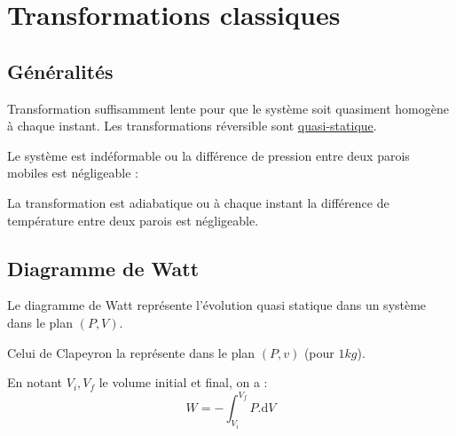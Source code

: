 \documentclass[11pt]{article}
\theoremstyle{cstyle}{\newtheorem{definition}{Définition}[section]}
\theoremstyle{cstyle}{\newtheorem{proposition}[definition]{Propriété}}
\theoremstyle{cstyle}{\newtheorem{theorem}[definition]{Théorème}}
\theoremstyle{mystyle}{\newtheorem{lemma}[definition]{Lemme}}
\theoremstyle{mystyle}{\newtheorem{corollary}[definition]{Corollaire}}
\theoremstyle{mystyle}{\newtheorem*{remark}{Remarque}}
\theoremstyle{mystyle}{\newtheorem*{remarks}{Remarques}}
\theoremstyle{mystyle}{\newtheorem*{example}{Exemple}}
\theoremstyle{mystyle}{\newtheorem*{examples}{Exemples}}
\theoremstyle{definition}{\newtheorem*{exercise}{Exercice}}
\theoremstyle{mystyle}{\newtheorem*{methode}{Méthode}}
\theoremstyle{cstyle}{\newtheorem*{cthm}{}}
\theoremstyle{warn}
\begin{document}
	\hfill
	\vrule
	\hfill
	\begin{minipage}[t]{0.45\textwidth}
		\section{Transformations classiques}
		\subsection{Généralités}
		
		\begin{definition}
			Transformation suffisamment lente pour que le système soit quasiment homogène à chaque instant. Les transformations réversible sont \underline{quasi-statique}.
		\end{definition}
		
		\begin{definition}
			Le système est indéformable ou la différence de pression entre deux parois mobiles est négligeable : 
		\end{definition}
		
		\begin{definition}
			La transformation est adiabatique ou à chaque instant la différence de température entre deux parois est négligeable. 			
		\end{definition}
		
		\subsection{Diagramme de Watt}
		
		\begin{definition}
			Le diagramme de Watt représente l'évolution quasi statique dans un système dans le plan \((P,V)\).
			
			Celui de Clapeyron la représente dans le plan \((P, v)\) (pour \(1kg\)).
		\end{definition}
		
		\begin{proposition}
			En notant \(V_i, V_f\) le volume initial et final, on a :
			\[
			W = - \int_{V_i}^{V_f} P.\text{d}V
			\]
		\end{proposition}
	\end{minipage}
\end{document}
